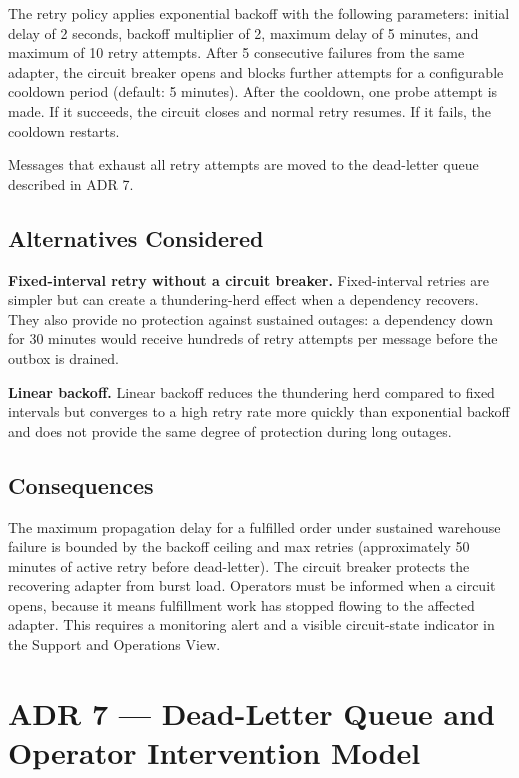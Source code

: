 The retry policy applies exponential backoff with the following parameters: initial delay of
2 seconds, backoff multiplier of 2, maximum delay of 5 minutes, and maximum of 10 retry
attempts. After 5 consecutive failures from the same adapter, the circuit breaker opens and
blocks further attempts for a configurable cooldown period (default: 5 minutes). After the
cooldown, one probe attempt is made. If it succeeds, the circuit closes and normal retry
resumes. If it fails, the cooldown restarts.

Messages that exhaust all retry attempts are moved to the dead-letter queue described in
ADR 7.

\subsection{Alternatives Considered}

\textbf{Fixed-interval retry without a circuit breaker.} Fixed-interval retries are simpler but
can create a thundering-herd effect when a dependency recovers. They also provide no protection
against sustained outages: a dependency down for 30 minutes would receive hundreds of retry
attempts per message before the outbox is drained.

\textbf{Linear backoff.} Linear backoff reduces the thundering herd compared to fixed intervals
but converges to a high retry rate more quickly than exponential backoff and does not provide
the same degree of protection during long outages.

\subsection{Consequences}

The maximum propagation delay for a fulfilled order under sustained warehouse failure is bounded
by the backoff ceiling and max retries (approximately 50 minutes of active retry before
dead-letter). The circuit breaker protects the recovering adapter from burst load. Operators
must be informed when a circuit opens, because it means fulfillment work has stopped flowing
to the affected adapter. This requires a monitoring alert and a visible circuit-state indicator
in the Support and Operations View.

\section{ADR 7 --- Dead-Letter Queue and Operator Intervention Model}

